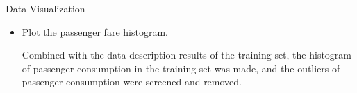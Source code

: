 \documentclass[
 size=14pt,
 paper=smartboard,  %
 mode=present, 		%
 display=slides, 	%
 style=tuliplab,  	%
 pauseslide,
 fleqn,leqno]{powerdot}
\begin{document}
\begin{slide}{Data Visualization}
  \begin{itemize}
  \item
  \smallskip
  Plot the passenger fare histogram.
  
  Combined with the data description results of the training set, the histogram of passenger consumption in the training set was made, and the outliers of passenger consumption were screened and removed.
  \end{itemize}
  
  \bigskip
  \bigskip
  \begin{figure}[htbp]
    \centering
\end{figure}
\end{slide}
\end{document}
